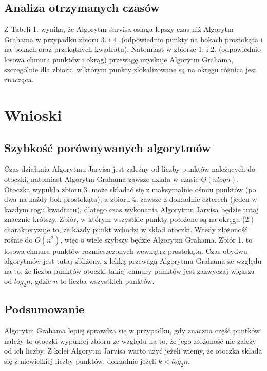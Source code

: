 \documentclass[11pt]{scrartcl}
\begin{document}
    \subsection{Analiza otrzymanych czasów}
    Z Tabeli 1. wynika, że Algorytm Jarvisa osiąga lepszy czas niż Algorytm
    Grahama w przypadku zbioru 3. i 4. (odpowiednio punkty na bokach prostokąta
    i na bokach oraz przekątnych kwadratu). Natomiast w zbiorze 1. i 2.
    (odpowiednio losowa chmura punktów i okrąg) przewagę uzyskuje Algorytm
    Grahama, szczególnie dla zbioru, w którym punkty zlokalizowane są na okręgu
    różnica jest znacząca.

    \section{Wnioski}
    \subsection*{Szybkość porównywanych algorytmów}
    Czas działania Algorytmu Jarvisa jest zależny od liczby punktów należących
    do otoczki, natomiast Algorytm Grahama zawsze działa w czasie $O(nlogn)$.
    Otoczka wypukła zbioru 3. może składać się z maksymalnie ośmiu punktów (po
    dwa na każdy bok prostokąta), a zbioru 4. zawsze z dokładnie czterech (jeden
    w każdym rogu kwadratu), dlatego czas wykonania Algorytmu Jarvisa będzie tutaj
    znacznie krótszy. Zbiór, w którym wszystkie punkty położone są na okręgu (2.)
    charakteryzuje to, że każdy punkt wchodzi w skład otoczki. Wtedy złożoność
    rośnie do $O(n^2)$, więc o wiele szybszy będzie Algorytm Grahama. Zbiór 1.
    to losowa chmura punktów rozmieszczonych wewnątrz prostokąta. Czas obydwu
    algorytmów jest tutaj zbliżony, z lekką przewagą Algorytmu Grahama ze
    względu na to, że liczba punktów otoczki takiej chmury punktów jest zazwyczaj
    większa od $log_2n$, gdzie $n$ to liczba wszystkich punktów.

    \subsection*{Podsumowanie}
    Algorytm Grahama lepiej sprawdza się w przypadku, gdy znaczna część puntków
    należy to otoczki wypukłej zbioru ze względu na to, że jego złożoność nie
    zależy od ich liczby. Z kolei Algorytm Jarvisa warto użyć jeżeli wiemy, że
    otoczka składa się z niewielkiej liczby punktów, dokładnie jeżeli
    $k < log_2n$.
\end{document}
